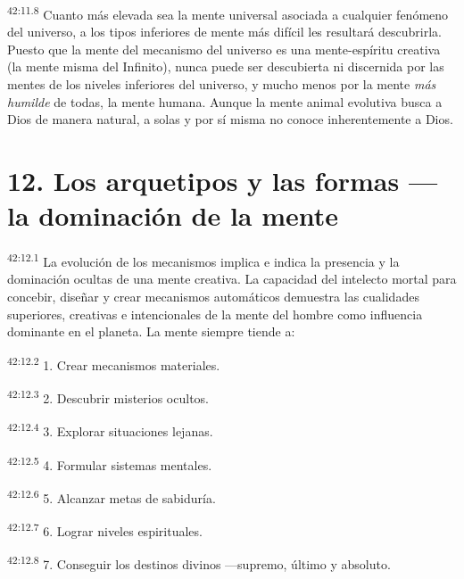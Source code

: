 \par
\textsuperscript{42:11.8} Cuanto más elevada sea la mente universal asociada a cualquier fenómeno del universo, a los tipos inferiores de mente más difícil les resultará descubrirla. Puesto que la mente del mecanismo del universo es una mente-espíritu creativa (la mente misma del Infinito), nunca puede ser descubierta ni discernida por las mentes de los niveles inferiores del universo, y mucho menos por la mente \textit{más humilde} de todas, la mente humana. Aunque la mente animal evolutiva busca a Dios de manera natural, a solas y por sí misma no conoce inherentemente a Dios.

\section*{12. Los arquetipos y las formas ---la dominación de la mente}
\par
\textsuperscript{42:12.1} La evolución de los mecanismos implica e indica la presencia y la dominación ocultas de una mente creativa. La capacidad del intelecto mortal para concebir, diseñar y crear mecanismos automáticos demuestra las cualidades superiores, creativas e intencionales de la mente del hombre como influencia dominante en el planeta. La mente siempre tiende a:

\par
\textsuperscript{42:12.2} 1. Crear mecanismos materiales.

\par
\textsuperscript{42:12.3} 2. Descubrir misterios ocultos.

\par
\textsuperscript{42:12.4} 3. Explorar situaciones lejanas.

\par
\textsuperscript{42:12.5} 4. Formular sistemas mentales.

\par
\textsuperscript{42:12.6} 5. Alcanzar metas de sabiduría.

\par
\textsuperscript{42:12.7} 6. Lograr niveles espirituales.

\par
\textsuperscript{42:12.8} 7. Conseguir los destinos divinos ---supremo, último y absoluto.

